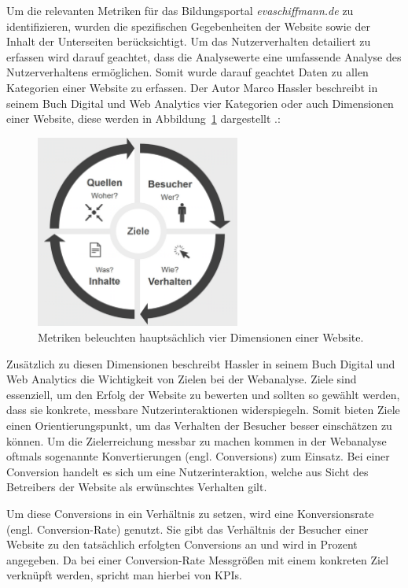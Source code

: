 Um die relevanten Metriken für das Bildungsportal \textit{evaschiffmann.de} zu identifizieren, wurden die spezifischen Gegebenheiten der Website sowie der Inhalt der Unterseiten berücksichtigt. Um das Nutzerverhalten detailiert zu erfassen wird darauf geachtet, dass die Analysewerte eine umfassende Analyse des Nutzerverhaltens ermöglichen. Somit wurde darauf geachtet Daten zu allen Kategorien einer Website zu erfassen. Der Autor Marco Hassler beschreibt in seinem Buch \glqq Digital und Web Analytics\grqq{} vier Kategorien oder auch Dimensionen einer Website, diese werden in Abbildung~\ref{fig:dimensionen} dargestellt \parencite[Kap.5.7]{Hassler2019}.: 

\begin{figure}[H]
    \centering
    \includegraphics[width=0.6\textwidth, keepaspectratio]{images/dimensionen.png}
    \caption{Metriken beleuchten hauptsächlich vier Dimensionen einer Website. \parencite[Kap.5.7]{Hassler2019}}
    \label{fig:dimensionen}
\end{figure}


Zusätzlich zu diesen Dimensionen beschreibt Hassler in seinem Buch \glqq Digital und Web Analytics\grqq{} die Wichtigkeit von Zielen bei der Webanalyse. Ziele sind essenziell, um den Erfolg der Website zu bewerten und sollten so gewählt werden, dass sie konkrete, messbare Nutzerinteraktionen widerspiegeln. Somit bieten Ziele einen Orientierungspunkt, um das Verhalten der Besucher besser einschätzen zu können. Um die Zielerreichung messbar zu machen kommen in der Webanalyse oftmals sogenannte Konvertierungen (engl. Conversions) zum Einsatz. Bei einer Conversion handelt es sich um eine Nutzerinteraktion, welche aus Sicht des Betreibers der Website als erwünschtes Verhalten gilt. \parencite[Kap.13]{Hassler2019}

Um diese Conversions in ein Verhältnis zu setzen, wird eine Konversionsrate (engl. Conversion-Rate) genutzt. Sie gibt das Verhältnis der Besucher einer Website zu den tatsächlich erfolgten Conversions an und wird in Prozent angegeben. Da bei einer Conversion-Rate Messgrößen mit einem konkreten Ziel verknüpft werden, spricht man hierbei von KPIs. \parencite{RyteConversion}

